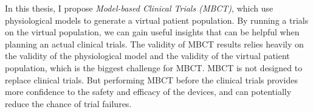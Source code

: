 \documentclass[a4paper]{article}
\begin{document}
In this thesis, I propose \emph{Model-based Clinical Trials (MBCT)}, which use physiological models to generate a virtual patient population.
By running a trials on the virtual population, we can gain useful insights that can be helpful when planning an actual clinical trials.
The validity of MBCT results relies heavily on the validity of the physiological model and the validity of the virtual patient population, which is the biggest challenge for MBCT.
MBCT is not designed to replace clinical trials.
But performing MBCT before the clinical trials provides more confidence to the safety and efficacy of the devices, and can potentially reduce the chance of trial failures.
\end{document}
